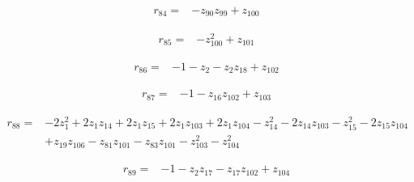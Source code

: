 \par\noindent\begin{minipage}{\linewidth}
\begin{align*}
r_{84}={}&-z_{90}z_{99}+z_{100}
\end{align*}
\end{minipage}\par
\par\noindent\begin{minipage}{\linewidth}
\begin{align*}
r_{85}={}&-z_{100}^{2}+z_{101}
\end{align*}
\end{minipage}\par
\par\noindent\begin{minipage}{\linewidth}
\begin{align*}
r_{86}={}&-1-z_{2}-z_{2}z_{18}+z_{102}
\end{align*}
\end{minipage}\par
\par\noindent\begin{minipage}{\linewidth}
\begin{align*}
r_{87}={}&-1-z_{16}z_{102}+z_{103}
\end{align*}
\end{minipage}\par
\par\noindent\begin{minipage}{\linewidth}
\begin{align*}
r_{88}={}&-2z_{1}^{2}+2z_{1}z_{14}+2z_{1}z_{15}+2z_{1}z_{103}+2z_{1}z_{104}-z_{14}^{2}-2z_{14}z_{103}-z_{15}^{2}-2z_{15}z_{104}\\[-2pt]
&+z_{19}z_{106}-z_{81}z_{101}-z_{83}z_{101}-z_{103}^{2}-z_{104}^{2}
\end{align*}
\end{minipage}\par
\par\noindent\begin{minipage}{\linewidth}
\begin{align*}
r_{89}={}&-1-z_{2}z_{17}-z_{17}z_{102}+z_{104}
\end{align*}
\end{minipage}\par
